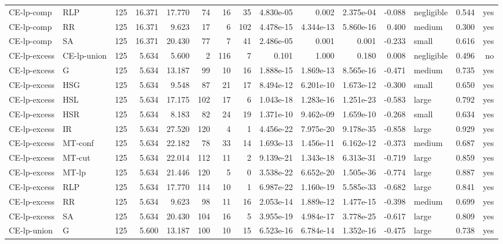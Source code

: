 \begin{table}[htbp]
\begin{tabular}{llrrrrrrrrrrlrr}
CE-lp-comp & RLP & 125 & 16.371 & 17.770 & 74 & 16 & 35 & 4.830e-05 & 0.002 & 2.375e-04 & -0.088 & negligible & 0.544 & yes \\
CE-lp-comp & RR & 125 & 16.371 & 9.623 & 17 & 6 & 102 & 4.478e-15 & 4.344e-13 & 5.860e-16 & 0.400 & medium & 0.300 & yes \\
CE-lp-comp & SA & 125 & 16.371 & 20.430 & 77 & 7 & 41 & 2.486e-05 & 0.001 & 0.001 & -0.233 & small & 0.616 & yes \\
CE-lp-excess & CE-lp-union & 125 & 5.634 & 5.600 & 2 & 116 & 7 & 0.101 & 1.000 & 0.180 & 0.008 & negligible & 0.496 & no \\
CE-lp-excess & G & 125 & 5.634 & 13.187 & 99 & 10 & 16 & 1.888e-15 & 1.869e-13 & 8.565e-16 & -0.471 & medium & 0.735 & yes \\
CE-lp-excess & HSG & 125 & 5.634 & 9.548 & 87 & 21 & 17 & 8.494e-12 & 6.201e-10 & 1.673e-12 & -0.300 & small & 0.650 & yes \\
CE-lp-excess & HSL & 125 & 5.634 & 17.175 & 102 & 17 & 6 & 1.043e-18 & 1.283e-16 & 1.251e-23 & -0.583 & large & 0.792 & yes \\
CE-lp-excess & HSR & 125 & 5.634 & 8.183 & 82 & 24 & 19 & 1.371e-10 & 9.462e-09 & 1.659e-10 & -0.268 & small & 0.634 & yes \\
CE-lp-excess & IR & 125 & 5.634 & 27.520 & 120 & 4 & 1 & 4.456e-22 & 7.975e-20 & 9.178e-35 & -0.858 & large & 0.929 & yes \\
CE-lp-excess & MT-conf & 125 & 5.634 & 22.182 & 78 & 33 & 14 & 1.693e-13 & 1.456e-11 & 6.162e-12 & -0.373 & medium & 0.687 & yes \\
CE-lp-excess & MT-cut & 125 & 5.634 & 22.014 & 112 & 11 & 2 & 9.139e-21 & 1.343e-18 & 6.313e-31 & -0.719 & large & 0.859 & yes \\
CE-lp-excess & MT-lp & 125 & 5.634 & 21.446 & 120 & 5 & 0 & 3.538e-22 & 6.652e-20 & 1.505e-36 & -0.774 & large & 0.887 & yes \\
CE-lp-excess & RLP & 125 & 5.634 & 17.770 & 114 & 10 & 1 & 6.987e-22 & 1.160e-19 & 5.585e-33 & -0.682 & large & 0.841 & yes \\
CE-lp-excess & RR & 125 & 5.634 & 9.623 & 98 & 11 & 16 & 2.053e-14 & 1.889e-12 & 1.477e-15 & -0.398 & medium & 0.699 & yes \\
CE-lp-excess & SA & 125 & 5.634 & 20.430 & 104 & 16 & 5 & 3.955e-19 & 4.984e-17 & 3.778e-25 & -0.617 & large & 0.809 & yes \\
CE-lp-union & G & 125 & 5.600 & 13.187 & 100 & 10 & 15 & 6.523e-16 & 6.784e-14 & 1.352e-16 & -0.475 & large & 0.738 & yes \\

\end{tabular}
\end{table}

